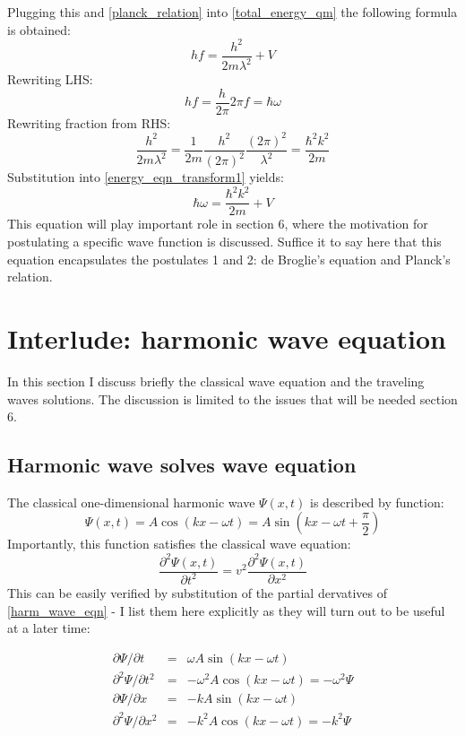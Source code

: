 \documentclass[12pt]{article}
\begin{document}
Plugging this and \eqref{planck_relation} into \eqref{total_energy_qm} the following formula is obtained:
\begin{equation}\label{energy_eqn_transform1}
hf = \frac{h^2}{2m\lambda^2} + V
\end{equation}
Rewriting LHS:
$$ hf = \frac{h}{2\pi} 2\pi f = \hbar \omega $$
Rewriting fraction from RHS:
$$ 
\frac{h^2}{2m\lambda^2} = 
\frac{1}{2m} \frac{h^2}{(2 \pi)^2} \frac{(2 \pi)^2}{\lambda^2} =
\frac{\hbar^2 k^2}{2m}
$$
Substitution into \eqref{energy_eqn_transform1} yields:
\begin{equation}
\label{energy_eqtn_qm}
\hbar \omega = \frac{\hbar^2 k^2}{2m} + V
\end{equation}
This equation will play important role in section 6, where the motivation 
for postulating a specific wave function is discussed. Suffice it to 
say here that this equation encapsulates the postulates 1 and 2: 
de Broglie's equation and Planck's relation.

\section{Interlude: harmonic wave equation}
In this section I discuss briefly the classical wave equation and the traveling waves solutions. 
The discussion is limited to the issues that will be needed section 6.
\subsection{Harmonic wave solves wave equation}
The classical one-dimensional harmonic wave $\Psi(x, t)$ is described by function:
\begin{equation}
\label{harm_wave_eqn}
\Psi(x, t) = A \cos (kx - \omega t) = A \sin (kx - \omega t + \frac{\pi}{2})
\end{equation}
Importantly, this function satisfies the classical wave equation:
\begin{equation}
\label{the_wave_equation}
\frac{\partial^2 \Psi(x,t)}{\partial t^2} = v^2 \frac{\partial^2 \Psi(x, t)}{\partial x^2}
\end{equation}
This can be easily verified by substitution of the partial dervatives of \eqref{harm_wave_eqn} - I list them here explicitly as they will turn out to be useful at a later time:

\begin{eqnarray}
\partial \Psi / \partial t &=& \omega A \sin (kx - \omega t) \\
\partial^2 \Psi / \partial t^2 &=& - \omega^2 A \cos (kx - \omega t) = -\omega^2 \Psi \\
\partial \Psi / \partial x &=& -k A \sin (kx - \omega t) \\
\label{psi_2nd_der_x}
\partial^2 \Psi / \partial x^2 &=& -k^2 A \cos (kx - \omega t) = -k^2 \Psi
\end{eqnarray}
\end{document}
